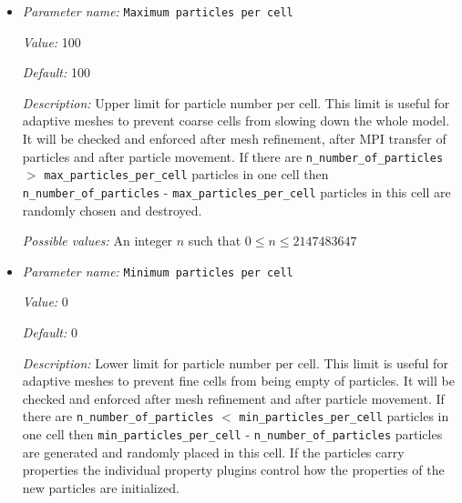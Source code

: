 \begin{itemize}
{\it Value:} repartition


{\it Default:} repartition


{\it Description:} Strategy that is used to balance the computational load across processors for adaptive meshes.


{\it Possible values:} A comma-separated list of any of none, remove particles, add particles, remove and add particles, repartition
\item {\it Parameter name:} {\tt Maximum particles per cell}
\label{parameters:Postprocess/Particles/Maximum particles per cell}


{\it Value:} 100


{\it Default:} 100


{\it Description:} Upper limit for particle number per cell. This limit is useful for adaptive meshes to prevent coarse cells from slowing down the whole model. It will be checked and enforced after mesh refinement, after MPI transfer of particles and after particle movement. If there are \texttt{n\_number\_of\_particles} $>$ \texttt{max\_particles\_per\_cell} particles in one cell then \texttt{n\_number\_of\_particles} - \texttt{max\_particles\_per\_cell} particles in this cell are randomly chosen and destroyed.


{\it Possible values:} An integer $n$ such that $0\leq n \leq 2147483647$
\item {\it Parameter name:} {\tt Minimum particles per cell}
\label{parameters:Postprocess/Particles/Minimum particles per cell}


{\it Value:} 0


{\it Default:} 0


{\it Description:} Lower limit for particle number per cell. This limit is useful for adaptive meshes to prevent fine cells from being empty of particles. It will be checked and enforced after mesh refinement and after particle movement. If there are \texttt{n\_number\_of\_particles} $<$ \texttt{min\_particles\_per\_cell} particles in one cell then \texttt{min\_particles\_per\_cell} - \texttt{n\_number\_of\_particles} particles are generated and randomly placed in this cell. If the particles carry properties the individual property plugins control how the properties of the new particles are initialized.



\end{itemize}
